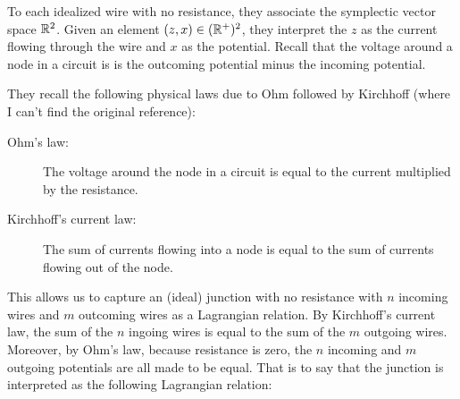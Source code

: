 To each idealized wire with no resistance, they associate the symplectic vector space $\mathbb{R}^{2}$.  Given an element $(z,x) \in (\mathbb{R}^+)^2$,  they interpret the $z$ as the current flowing through the wire and $x$ as the potential.  Recall that the voltage around a node in a circuit is is the outcoming potential minus the incoming potential.

They recall the following physical laws due to Ohm \cite{ohm} followed by Kirchhoff (where I can't find the original reference):

\begin{description}
\item[Ohm's law:]  The voltage around the node in a circuit is equal to the current multiplied by the resistance.

\item[Kirchhoff's current law:] The sum of currents flowing into a node is equal to the sum of currents flowing out of the node.
\end{description}





This allows us to capture an (ideal) junction with no resistance with $n$ incoming wires and $m$ outcoming wires as a Lagrangian relation.  By Kirchhoff's current law, the sum of the $n$ ingoing wires is equal to the sum of the $m$ outgoing wires.  Moreover, by Ohm's law, because resistance is zero, the $n$ incoming and $m$ outgoing potentials are all made to be equal.  That is to say that the junction is interpreted as the following Lagrangian relation:


